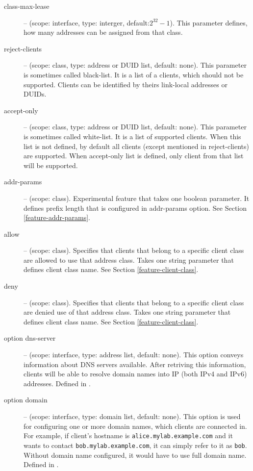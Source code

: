 \begin{description}
\item[class-max-lease]  -- (scope: interface, type: interger,
            default:$2^{32}-1$). This parameter defines, how many
            addresses can be assigned from that class.

\item[reject-clients] -- (scope: class, type: address or DUID list,
            default: none). This parameter is sometimes called
            black-list. It is a list of a clients, which should not be
            supported. Clients can be identified by theirs link-local
            addresses or DUIDs.

\item[accept-only] -- (scope: class, type: address or DUID list,
            default: none). This parameter is sometimes called
            white-list. It is a list of supported clients. When this
            list is not defined, by default all clients (except
            mentioned in reject-clients) are supported. When
            accept-only list is defined, only client from that list
            will be supported.

\item[addr-params] -- (scope: class). Experimental feature that takes 
  one boolean parameter. It defines prefix length that is configured
  in addr-params option. See Section \ref{feature-addr-params}.

\item[allow] -- (scope: class). Specifies that clients that belong to
  a specific client class are allowed to use that address class. Takes
  one string parameter that defines client class name. See Section
  \ref{feature-client-class}.

\item[deny] -- (scope: class). Specifies that clients that belong to
  a specific client class are denied use of that address class. Takes
  one string parameter that defines client class name. See Section
  \ref{feature-client-class}.

 \item[option dns-server] -- (scope: interface, type: address list, default:
   none). This option conveys information about DNS servers
   available. After retriving this information, clients will be able
   to resolve domain names into IP (both IPv4 and IPv6)
   addresses. Defined in \cite{rfc3596}.

 \item[option domain] -- (scope: interface, type: domain list, default:
   none). This option is used for configuring one or more domain
   names, which clients are connected in. For example, if client's
   hostname is \verb+alice.mylab.example.com+ and it wants to contact
   \verb+bob.mylab.example.com+, it can simply refer to it as
   \verb+bob+. Without domain name configured, it would have to use
   full domain name. Defined in \cite{rfc3596}.


\end{description}
